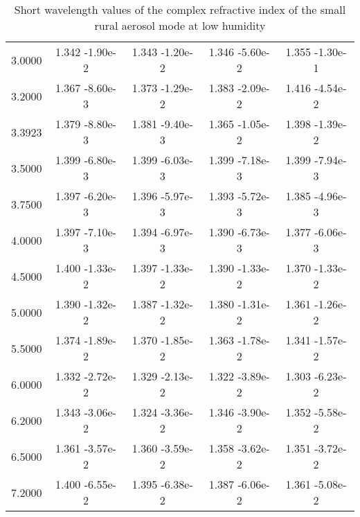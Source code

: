 \documentclass[12pt]{article}
\begin{document}
\begin{center}
\begin{table}
\begin{tabular}{| c | c | c | c | c |  }
3.0000  &  1.342 -1.90e-2  &  1.343 -1.20e-2  &  1.346 -5.60e-2  &  1.355 -1.30e-1  \\ 
3.2000 &   1.367 -8.60e-3  &  1.373 -1.29e-2  &  1.383 -2.09e-2  &  1.416 -4.54e-2  \\
3.3923 &   1.379 -8.80e-3  &  1.381 -9.40e-3 &   1.365 -1.05e-2  &  1.398 -1.39e-2 \\ 
3.5000 &   1.399 -6.80e-3  &  1.399 -6.03e-3  &  1.399 -7.18e-3  &  1.399 -7.94e-3  \\ 
3.7500 &   1.397 -6.20e-3  &  1.396 -5.97e-3 &   1.393 -5.72e-3  &  1.385 -4.96e-3 \\  
4.0000 &   1.397 -7.10e-3  &  1.394 -6.97e-3 &   1.390 -6.73e-3  &  1.377 -6.06e-3  \\
4.5000 &   1.400 -1.33e-2  &  1.397 -1.33e-2 &   1.390 -1.33e-2  &  1.370 -1.33e-2  \\ 
5.0000 &   1.390 -1.32e-2  &  1.387 -1.32e-2  &  1.380 -1.31e-2  &  1.361 -1.26e-2  \\ 
5.5000 &   1.374 -1.89e-2  &  1.370 -1.85e-2  &  1.363 -1.78e-2  &  1.341 -1.57e-2  \\ 
6.0000 &   1.332 -2.72e-2  &  1.329 -2.13e-2 &   1.322 -3.89e-2 &   1.303 -6.23e-2  \\ 
6.2000 &   1.343 -3.06e-2 &   1.324 -3.36e-2 &   1.346 -3.90e-2  &  1.352 -5.58e-2  \\ 
6.5000 &   1.361 -3.57e-2 &   1.360 -3.59e-2 &   1.358 -3.62e-2  &  1.351 -3.72e-2 \\  
7.2000 &   1.400 -6.55e-2 &   1.395 -6.38e-2 &   1.387 -6.06e-2  &  1.361 -5.08e-2 \\ 
\hline
\end{tabular}
\caption{Short wavelength values of the complex refractive index of the small rural aerosol mode at low humidity}
\end{table}
\end{center}
\end{document}
